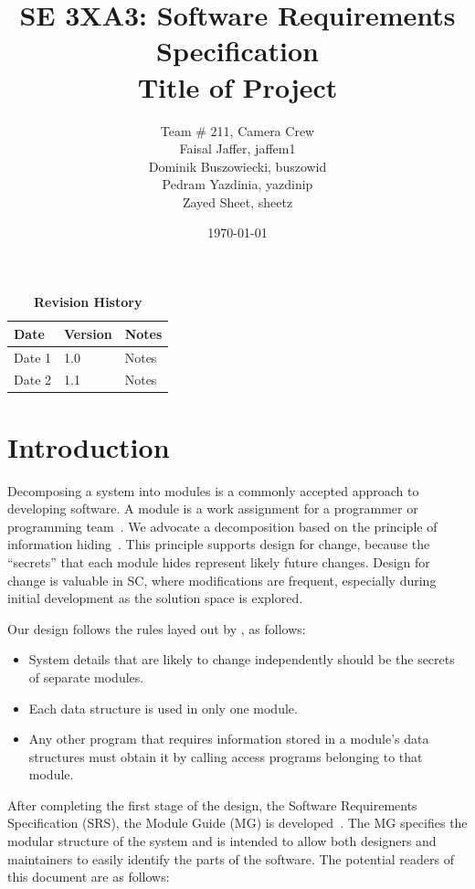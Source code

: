 \documentclass[12pt, titlepage]{article}
\title{SE 3XA3: Software Requirements Specification\\Title of Project}
\author{Team \# 211, Camera Crew
		\\ Faisal Jaffer, jaffem1
		\\ Dominik Buszowiecki, buszowid
		\\ Pedram Yazdinia, yazdinip
		\\ Zayed Sheet, sheetz
}
\date{\today}
\begin{document}
\maketitle

\tableofcontents
\listoftables
\listoffigures

\newpage

\begin{table}[h]
\caption{\bf Revision History}
\begin{tabularx}{\textwidth}{p{3cm}p{2cm}X}
\toprule {\bf Date} & {\bf Version} & {\bf Notes}\\
\midrule
Date 1 & 1.0 & Notes\\
Date 2 & 1.1 & Notes\\
\bottomrule
\end{tabularx}
\end{table}

\newpage



\section{Introduction}

Decomposing a system into modules is a commonly accepted approach to developing
software.  A module is a work assignment for a programmer or programming
team~\citep{ParnasEtAl1984}.  We advocate a decomposition
based on the principle of information hiding~\citep{Parnas1972a}.  This
principle supports design for change, because the ``secrets'' that each module
hides represent likely future changes.  Design for change is valuable in SC,
where modifications are frequent, especially during initial development as the
solution space is explored.  

Our design follows the rules layed out by \citet{ParnasEtAl1984}, as follows:
\begin{itemize}
\item System details that are likely to change independently should be the
  secrets of separate modules.
\item Each data structure is used in only one module.
\item Any other program that requires information stored in a module's data
  structures must obtain it by calling access programs belonging to that module.
\end{itemize}

After completing the first stage of the design, the Software Requirements
Specification (SRS), the Module Guide (MG) is developed~\citep{ParnasEtAl1984}. The MG
specifies the modular structure of the system and is intended to allow both
designers and maintainers to easily identify the parts of the software.  The
potential readers of this document are as follows:
\end{document}
